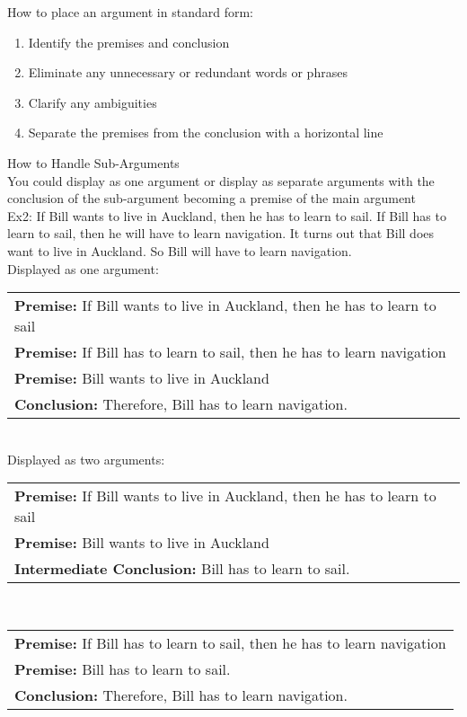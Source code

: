 How to place an argument in standard form:
\begin{enumerate}
    \item Identify the premises and conclusion
    \item Eliminate any unnecessary or redundant words or phrases
    \item Clarify any ambiguities
    \item Separate the premises from the conclusion with a horizontal line
\end{enumerate}

How to Handle Sub-Arguments\\
You could display as one argument or display as separate arguments with the conclusion of the sub-argument becoming a premise of the main argument\\
Ex2: If Bill wants to live in Auckland, then he has to learn to sail. If Bill has to learn to sail, then he will have to learn navigation. It turns out that Bill does want to live in Auckland. So Bill will have to learn navigation.\\

Displayed as one argument:\\
\begin{tabular}{p{16cm}}
    \textbf{Premise: }If Bill wants to live in Auckland, then he has to learn to sail\\
    \textbf{Premise: }If Bill has to learn to sail, then he has to learn navigation\\
    \textbf{Premise: }Bill wants to live in Auckland\\
    \hline
    \textbf{Conclusion: }Therefore, Bill has to learn navigation.
\end{tabular}\\

Displayed as two arguments:\\
\begin{tabular}{p{16cm}}
    \textbf{Premise: }If Bill wants to live in Auckland, then he has to learn to sail\\
    \textbf{Premise: }Bill wants to live in Auckland\\
    \hline
    \textbf{Intermediate Conclusion: }Bill has to learn to sail.
\end{tabular}\\

\begin{tabular}{p{16cm}}
    \textbf{Premise: }If Bill has to learn to sail, then he has to learn navigation\\
    \textbf{Premise: }Bill has to learn to sail.\\
    \hline
    \textbf{Conclusion: }Therefore, Bill has to learn navigation.
\end{tabular}\\

